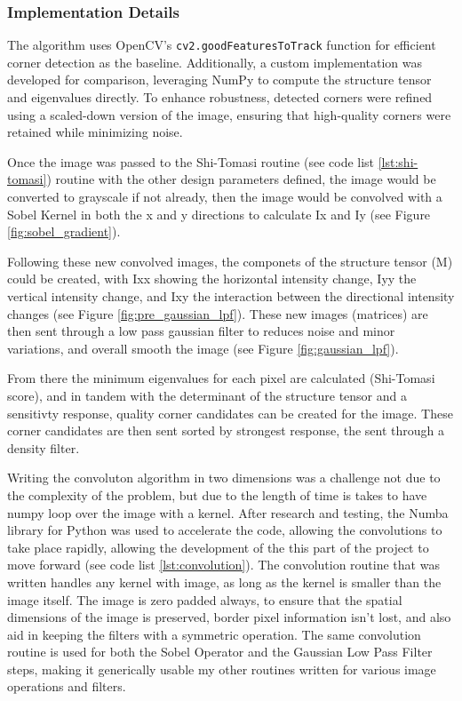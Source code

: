 \documentclass[11pt, conference, letterpaper]{IEEEtran}
\begin{document}
\subsubsection{Implementation Details}
The algorithm uses OpenCV's \texttt{cv2.goodFeaturesToTrack} function for efficient corner detection as the baseline. Additionally, a custom implementation was developed for comparison, leveraging NumPy to compute the structure tensor and eigenvalues directly.
To enhance robustness, detected corners were refined using a scaled-down version of the image, ensuring that high-quality corners were retained while minimizing noise. 

Once the image was passed to the Shi-Tomasi routine (see code list \ref{lst:shi-tomasi}) routine with the other design parameters defined, the image would be converted to grayscale if not already, then the image would be convolved with a Sobel Kernel in both the x and y directions to calculate Ix and Iy (see Figure \ref{fig:sobel_gradient}). 

Following these new convolved images, the componets of the structure tensor (M) could be created, with Ixx showing the horizontal intensity change, Iyy the vertical intensity change, and Ixy the interaction between the directional intensity changes (see Figure \ref{fig:pre_gaussian_lpf}). These new images (matrices) are then sent through a low pass gaussian filter to reduces noise and minor variations, and overall smooth the image (see Figure \ref{fig:gaussian_lpf}). 

From there the minimum eigenvalues for each pixel are calculated (Shi-Tomasi score), and in tandem with the determinant of the structure tensor and a sensitivty response, quality corner candidates can be created for the image. These corner candidates are then sent sorted by strongest response, the sent through a density filter.

Writing the convoluton algorithm in two dimensions was a challenge not due to the complexity of the problem, but due to the length of time is takes to have numpy loop over the image with a kernel. After research and testing, the Numba library for Python was used to accelerate the code, allowing the convolutions to take place rapidly, allowing the development of the this part of the project to move forward (see code list \ref{lst:convolution}). The convolution routine that was written handles any kernel with image, as long as the kernel is smaller than the image itself. The image is zero padded always, to ensure that the spatial dimensions of the image is preserved, border pixel information isn't lost, and also aid in keeping the filters with a symmetric operation. The same convolution routine is used for both the Sobel Operator and the Gaussian Low Pass Filter steps, making it generically usable my other routines written for various image operations and filters.
\end{document}
